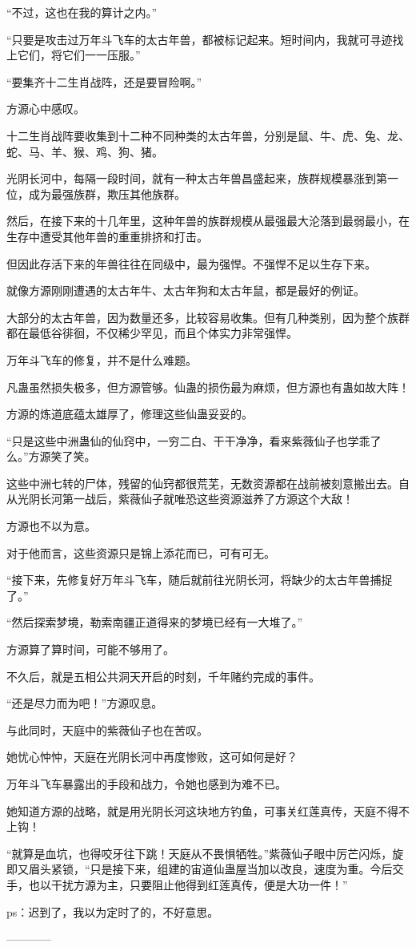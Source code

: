 \begin{this_body}
“不过，这也在我的算计之内。”

“只要是攻击过万年斗飞车的太古年兽，都被标记起来。短时间内，我就可寻迹找上它们，将它们一一压服。”

“要集齐十二生肖战阵，还是要冒险啊。”

方源心中感叹。

十二生肖战阵要收集到十二种不同种类的太古年兽，分别是鼠、牛、虎、兔、龙、蛇、马、羊、猴、鸡、狗、猪。

光阴长河中，每隔一段时间，就有一种太古年兽昌盛起来，族群规模暴涨到第一位，成为最强族群，欺压其他族群。

然后，在接下来的十几年里，这种年兽的族群规模从最强最大沦落到最弱最小，在生存中遭受其他年兽的重重排挤和打击。

但因此存活下来的年兽往往在同级中，最为强悍。不强悍不足以生存下来。

就像方源刚刚遭遇的太古年牛、太古年狗和太古年鼠，都是最好的例证。

大部分的太古年兽，因为数量还多，比较容易收集。但有几种类别，因为整个族群都在最低谷徘徊，不仅稀少罕见，而且个体实力非常强悍。

万年斗飞车的修复，并不是什么难题。

凡蛊虽然损失极多，但方源管够。仙蛊的损伤最为麻烦，但方源也有蛊如故大阵！

方源的炼道底蕴太雄厚了，修理这些仙蛊妥妥的。

“只是这些中洲蛊仙的仙窍中，一穷二白、干干净净，看来紫薇仙子也学乖了么。”方源笑了笑。

这些中洲七转的尸体，残留的仙窍都很荒芜，无数资源都在战前被刻意搬出去。自从光阴长河第一战后，紫薇仙子就唯恐这些资源滋养了方源这个大敌！

方源也不以为意。

对于他而言，这些资源只是锦上添花而已，可有可无。

“接下来，先修复好万年斗飞车，随后就前往光阴长河，将缺少的太古年兽捕捉了。”

“然后探索梦境，勒索南疆正道得来的梦境已经有一大堆了。”

方源算了算时间，可能不够用了。

不久后，就是五相公共洞天开启的时刻，千年赌约完成的事件。

“还是尽力而为吧！”方源叹息。

与此同时，天庭中的紫薇仙子也在苦叹。

她忧心忡忡，天庭在光阴长河中再度惨败，这可如何是好？

万年斗飞车暴露出的手段和战力，令她也感到为难不已。

她知道方源的战略，就是用光阴长河这块地方钓鱼，可事关红莲真传，天庭不得不上钩！

“就算是血坑，也得咬牙往下跳！天庭从不畏惧牺牲。”紫薇仙子眼中厉芒闪烁，旋即又眉头紧锁，“只是接下来，组建的宙道仙蛊屋当加以改良，速度为重。今后交手，也以干扰方源为主，只要阻止他得到红莲真传，便是大功一件！”

ps：迟到了，我以为定时了的，不好意思。

------------

\end{this_body}

